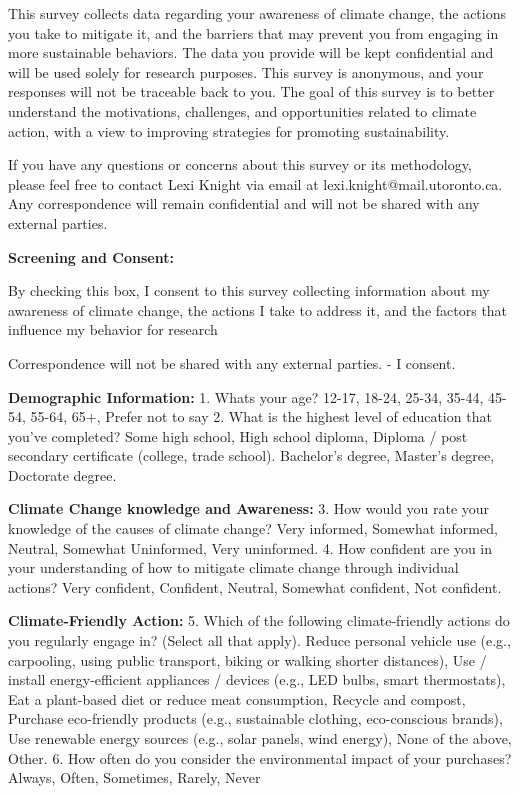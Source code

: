 \documentclass[
  letterpaper,
  DIV=11,
  numbers=noendperiod]{scrartcl}
\begin{document}
This survey collects data regarding your awareness of climate change,
the actions you take to mitigate it, and the barriers that may prevent
you from engaging in more sustainable behaviors. The data you provide
will be kept confidential and will be used solely for research purposes.
This survey is anonymous, and your responses will not be traceable back
to you. The goal of this survey is to better understand the motivations,
challenges, and opportunities related to climate action, with a view to
improving strategies for promoting sustainability.

If you have any questions or concerns about this survey or its
methodology, please feel free to contact Lexi Knight via email at
lexi.knight@mail.utoronto.ca. Any correspondence will remain
confidential and will not be shared with any external parties.

\textbf{Screening and Consent:}

By checking this box, I consent to this survey collecting information
about my awareness of climate change, the actions I take to address it,
and the factors that influence my behavior for research

Correspondence will not be shared with any external parties. - I
consent.

\textbf{Demographic Information: } 1. Whats your age? 12-17, 18-24,
25-34, 35-44, 45-54, 55-64, 65+, Prefer not to say 2. What is the
highest level of education that you've completed? Some high school, High
school diploma, Diploma / post secondary certificate (college, trade
school). Bachelor's degree, Master's degree, Doctorate degree.

\textbf{Climate Change knowledge and Awareness:} 3. How would you rate
your knowledge of the causes of climate change? Very informed, Somewhat
informed, Neutral, Somewhat Uninformed, Very uninformed. 4. How
confident are you in your understanding of how to mitigate climate
change through individual actions? Very confident, Confident, Neutral,
Somewhat confident, Not confident.

\textbf{Climate-Friendly Action: } 5. Which of the following
climate-friendly actions do you regularly engage in? (Select all that
apply). Reduce personal vehicle use (e.g., carpooling, using public
transport, biking or walking shorter distances), Use / install
energy-efficient appliances / devices (e.g., LED bulbs, smart
thermostats), Eat a plant-based diet or reduce meat consumption, Recycle
and compost, Purchase eco-friendly products (e.g., sustainable clothing,
eco-conscious brands), Use renewable energy sources (e.g., solar panels,
wind energy), None of the above, Other. 6. How often do you consider the
environmental impact of your purchases? Always, Often, Sometimes,
Rarely, Never
\end{document}
